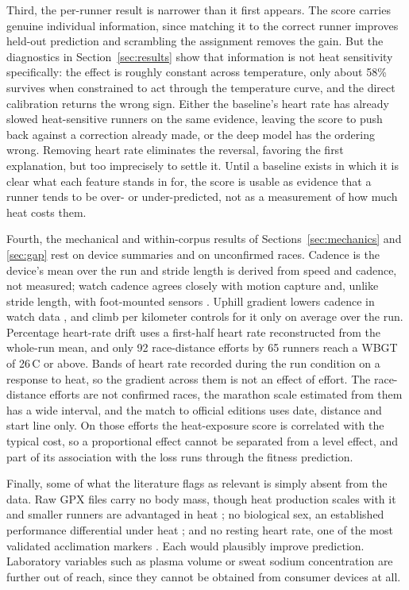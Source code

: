 \documentclass[11pt]{article}
\renewcommand{\_}{\textunderscore\allowbreak}
\begin{document}
Third, the per-runner result is narrower than it first appears. The score carries genuine individual information, since matching it to the correct runner improves held-out prediction and scrambling the assignment removes the gain. But the diagnostics in Section~\ref{sec:results} show that information is not heat sensitivity specifically: the effect is roughly constant across temperature, only about 58\% survives when constrained to act through the temperature curve, and the direct calibration returns the wrong sign. Either the baseline's heart rate has already slowed heat-sensitive runners on the same evidence, leaving the score to push back against a correction already made, or the deep model has the ordering wrong. Removing heart rate eliminates the reversal, favoring the first explanation, but too imprecisely to settle it. Until a baseline exists in which it is clear what each feature stands in for, the score is usable as evidence that a runner tends to be over- or under-predicted, not as a measurement of how much heat costs them.

Fourth, the mechanical and within-corpus results of Sections~\ref{sec:mechanics} and \ref{sec:gap} rest on device summaries and on unconfirmed races. Cadence is the device's mean over the run and stride length is derived from speed and cadence, not measured; watch cadence agrees closely with motion capture \citep{adams2016} and, unlike stride length, with foot-mounted sensors \citep{meingast2025}. Uphill gradient lowers cadence in watch data \citep{chan2025}, and climb per kilometer controls for it only on average over the run. Percentage heart-rate drift uses a first-half heart rate reconstructed from the whole-run mean, and only 92 race-distance efforts by 65 runners reach a WBGT of 26\,\textdegree C or above. Bands of heart rate recorded during the run condition on a response to heat, so the gradient across them is not an effect of effort. The race-distance efforts are not confirmed races, the marathon scale estimated from them has a wide interval, and the match to official editions uses date, distance and start line only. On those efforts the heat-exposure score is correlated with the typical cost, so a proportional effect cannot be separated from a level effect, and part of its association with the loss runs through the fitness prediction.

Finally, some of what the literature flags as relevant is simply absent from the data. Raw GPX files carry no body mass, though heat production scales with it and smaller runners are advantaged in heat \citep{marino2008, maughan2010}; no biological sex, an established performance differential under heat \citep{llewellyn2025, vihma2010, kelly2023, weiss2022b}; and no resting heart rate, one of the most validated acclimation markers \citep{periard2015, tyler2016, pryor2019}. Each would plausibly improve prediction. Laboratory variables such as plasma volume or sweat sodium concentration are further out of reach, since they cannot be obtained from consumer devices at all.
\end{document}
